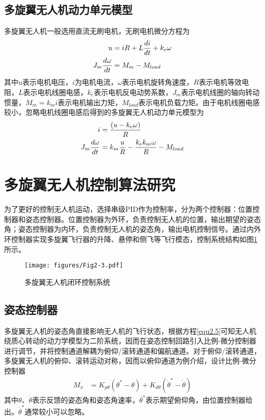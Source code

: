 \subsection{多旋翼无人机动力单元模型}
多旋翼无人机一般选用直流无刷电机，无刷电机微分方程为
\begin{equation}
\label{equ2.10}
\begin{aligned}
u &= iR + L {di \over dt} + k_e \omega
\\
J_m {d\omega \over dt} &= M_m - M_{load}
\end{aligned}
\end{equation}
其中$u$表示电机电压，$i$为电机电流，$\omega$表示电机旋转角速度，$R$表示电机等效电阻，$L$表示电机线圈电感，$k_e$表示电机反电动势系数，$J_m$表示电机线圈的轴向转动惯量，$M_m=k_m i$表示电机输出力矩，$M_{load}$表示电机负载力矩。由于电机线圈电感较小，忽略电机线圈电感后得到的多旋翼无人机动力单元模型为
\begin{equation}
\label{equ2.11}
\begin{aligned}
i &= {(u-k_e \omega) \over R }
\\
J_m {d \omega \over dt} &= k_m{u \over R } - {k_e k_m \omega \over R} - M_{load}
\end{aligned}
\end{equation}

\section{多旋翼无人机控制算法研究}
为了更好的控制无人机运动，选择串级PID作为控制率，分为两个控制器：位置控制器和姿态控制器\upcite{[2.5]}。位置控制器为外环，负责控制无人机的位置，输出期望的姿态角；姿态控制器为内环，负责控制无人机的姿态角，输出电机控制信号。通过内外环控制器实现多旋翼飞行器的升降、悬停和侧飞等飞行模态，控制系统结构如图\ref{fig2.3}所示。
\begin{figure}[h]
\centering
\texttt{[image: figures/Fig2-3.pdf]}
\caption{多旋翼无人机闭环控制系统}
\label{fig2.3}
\end{figure}

\subsection{姿态控制器}
多旋翼无人机的姿态角直接影响无人机的飞行状态，根据方程\eqref{equ2.5}可知无人机绕质心转动的动力学模型为二阶系统，因而在姿态控制回路引入比例-微分控制器进行调节，并将控制通道解耦为俯仰/滚转通道和偏航通道。对于俯仰/滚转通道，多旋翼无人机的俯仰、滚转运动对称，因而以俯仰通道为例介绍，设计比例-微分控制器
\begin{equation}
\label{equ2.12}
\begin{aligned}
M_x &= K_{p\theta} \left( \theta^* - \theta \right) + K_{d\theta} \left( \dot{\theta}^* -  \dot{\theta} \right)
\end{aligned}
\end{equation}
其中$\theta$、$\dot{\theta}$表示反馈的姿态角和姿态角速率，$\theta^*$表示期望俯仰角，由位置控制器给出。$ \dot{\theta}^*$通常较小可以忽略。

